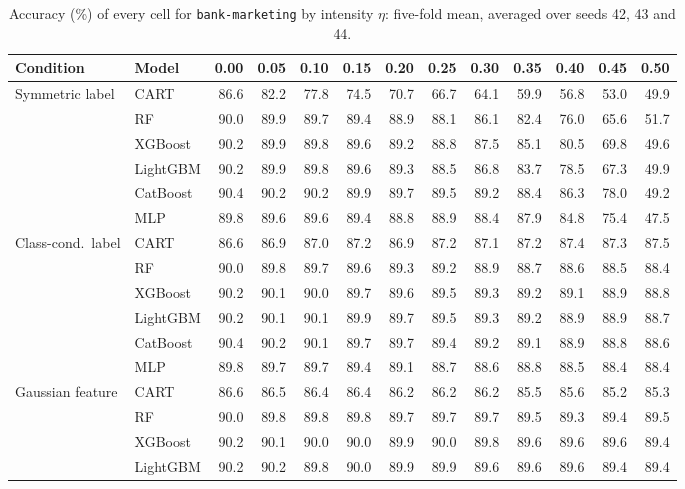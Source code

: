 \begin{table}[p]
\centering
\tiny
\setlength{\tabcolsep}{2.6pt}
\caption{Accuracy (\%) of every cell for \texttt{bank-marketing} by intensity $\eta$: five-fold mean, averaged over seeds 42, 43 and 44.}
\label{tab:grid_bank_marketing}
\begin{tabular}{@{}llrrrrrrrrrrr@{}}
\toprule
Condition & Model & 0.00 & 0.05 & 0.10 & 0.15 & 0.20 & 0.25 & 0.30 & 0.35 & 0.40 & 0.45 & 0.50 \\
\midrule
Symmetric label & CART & 86.6 & 82.2 & 77.8 & 74.5 & 70.7 & 66.7 & 64.1 & 59.9 & 56.8 & 53.0 & 49.9 \\
 & RF & 90.0 & 89.9 & 89.7 & 89.4 & 88.9 & 88.1 & 86.1 & 82.4 & 76.0 & 65.6 & 51.7 \\
 & XGBoost & 90.2 & 89.9 & 89.8 & 89.6 & 89.2 & 88.8 & 87.5 & 85.1 & 80.5 & 69.8 & 49.6 \\
 & LightGBM & 90.2 & 89.9 & 89.8 & 89.6 & 89.3 & 88.5 & 86.8 & 83.7 & 78.5 & 67.3 & 49.9 \\
 & CatBoost & 90.4 & 90.2 & 90.2 & 89.9 & 89.7 & 89.5 & 89.2 & 88.4 & 86.3 & 78.0 & 49.2 \\
 & MLP & 89.8 & 89.6 & 89.6 & 89.4 & 88.8 & 88.9 & 88.4 & 87.9 & 84.8 & 75.4 & 47.5 \\
\midrule
Class-cond.\ label & CART & 86.6 & 86.9 & 87.0 & 87.2 & 86.9 & 87.2 & 87.1 & 87.2 & 87.4 & 87.3 & 87.5 \\
 & RF & 90.0 & 89.8 & 89.7 & 89.6 & 89.3 & 89.2 & 88.9 & 88.7 & 88.6 & 88.5 & 88.4 \\
 & XGBoost & 90.2 & 90.1 & 90.0 & 89.7 & 89.6 & 89.5 & 89.3 & 89.2 & 89.1 & 88.9 & 88.8 \\
 & LightGBM & 90.2 & 90.1 & 90.1 & 89.9 & 89.7 & 89.5 & 89.3 & 89.2 & 88.9 & 88.9 & 88.7 \\
 & CatBoost & 90.4 & 90.2 & 90.1 & 89.7 & 89.7 & 89.4 & 89.2 & 89.1 & 88.9 & 88.8 & 88.6 \\
 & MLP & 89.8 & 89.7 & 89.7 & 89.4 & 89.1 & 88.7 & 88.6 & 88.8 & 88.5 & 88.4 & 88.4 \\
\midrule
Gaussian feature & CART & 86.6 & 86.5 & 86.4 & 86.4 & 86.2 & 86.2 & 86.2 & 85.5 & 85.6 & 85.2 & 85.3 \\
 & RF & 90.0 & 89.8 & 89.8 & 89.8 & 89.7 & 89.7 & 89.7 & 89.5 & 89.3 & 89.4 & 89.5 \\
 & XGBoost & 90.2 & 90.1 & 90.0 & 90.0 & 89.9 & 90.0 & 89.8 & 89.6 & 89.6 & 89.6 & 89.4 \\
 & LightGBM & 90.2 & 90.2 & 89.8 & 90.0 & 89.9 & 89.9 & 89.6 & 89.6 & 89.6 & 89.4 & 89.4 \\

\end{tabular}
\end{table}
